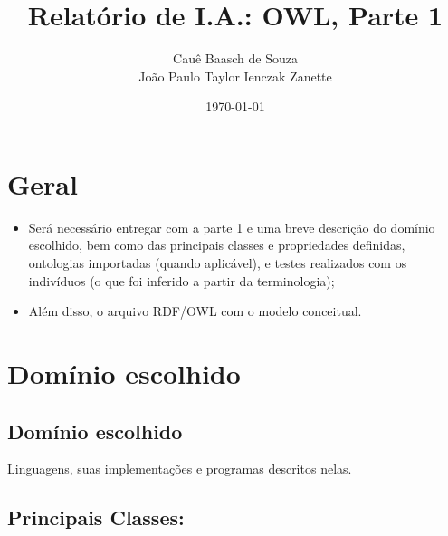 \documentclass[answers]{exam}
\title{Relatório de I.A.: OWL, Parte 1}
\author{Cauê Baasch de Souza \\
        João Paulo Taylor Ienczak Zanette}
\date{\today}
\newcommand{\todo}[1]{{\color{red}{#1}}}
\begin{document}
    \maketitle{}

    \todo{%
        TO-DO\@:
        \begin{itemize}
            \item Adicionar enunciado da 2ª parte (parte prática);
            \item Escolher domínio dos exemplos.
        \end{itemize}
    }

    \section{Geral}

    \begin{superframe}
        \begin{itemize}
            \item Será necessário entregar com a parte 1 e uma breve descrição
                do domínio escolhido, bem como das principais classes e
                propriedades definidas, ontologias importadas (quando
                aplicável), e testes realizados com os indivíduos (o que foi
                inferido a partir da terminologia);

            \item Além disso, o arquivo RDF/OWL com o modelo conceitual.
        \end{itemize}
    \end{superframe}

    \section{Domínio escolhido}

    \subsection{Domínio escolhido}

    Linguagens, suas implementações e programas descritos nelas.

    \subsection{Principais Classes:}
\end{document}
